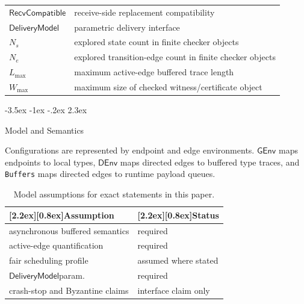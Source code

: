 \documentclass[a4paper,10pt,twocolumn,english]{article}
\makeatletter
\renewcommand{\section}{\@startsection{section}{1}{\z@}%
  {-3.5ex \@plus -1ex \@minus -.2ex}%
  {2.3ex}%
  {\raggedright\normalfont\large\bfseries}}
\numberwithin{equation}{section}
\theoremstyle{paperdef}
\theoremstyle{paperplain}
\theoremstyle{paperdef}
\theoremstyle{paperremark}
\newcommand{\thead}[1]{\textbf{\raisebox{0pt}[2.2ex][0.8ex]{#1}}}
\newcommand{\GEnv}{\ensuremath{\mathsf{GEnv}}}
\newcommand{\DEnv}{\ensuremath{\mathsf{DEnv}}}
\newcommand{\DeliveryModel}{\ensuremath{\mathsf{DeliveryModel}}}
\newcommand{\RecvCompatible}{\ensuremath{\mathsf{RecvCompatible}}}
\makeatother
\begin{document}
\begin{center}
\begin{tabularx}{\columnwidth}{@{}L{0.36\columnwidth}L{0.59\columnwidth}@{}}
		\RecvCompatible & receive-side replacement compatibility                           \\
		\DeliveryModel  & parametric delivery interface                                    \\
		$N_s$           & explored state count in finite checker objects                   \\
		$N_e$           & explored transition-edge count in finite checker objects         \\
		$L_{\max}$      & maximum active-edge buffered trace length                        \\
		$W_{\max}$      & maximum size of checked witness/certificate object               \\
		\bottomrule
	\end{tabularx}
\end{center}

\section{Model and Semantics}
\label{sec:model}

Configurations are represented by endpoint and edge environments. \GEnv{} maps endpoints to local types, \DEnv{} maps directed edges to buffered type traces, and \texttt{Buffers} maps directed edges to runtime payload queues.

\begin{table}[H]
	\centering
	\small
	\begin{tabularx}{\columnwidth}{@{}L{0.55\columnwidth}L{0.4\columnwidth}@{}}
		\toprule
		\thead{Assumption}              & \thead{Status}       \\
		\midrule
		asynchronous buffered semantics & required             \\
		active-edge quantification      & required             \\
		fair scheduling profile         & assumed where stated \\
		\DeliveryModel param.           & required             \\
		crash-stop and Byzantine claims & interface claim only \\
		\bottomrule
	\end{tabularx}
	\caption{Model assumptions for exact statements in this paper.}
\end{table}
\end{document}
